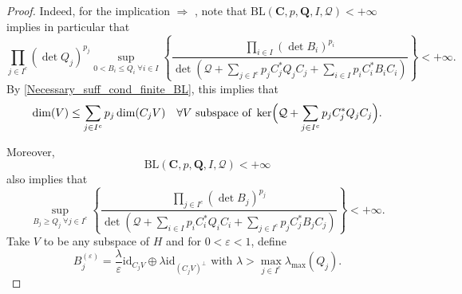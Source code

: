 \documentclass[11pt,a4paper,reqno]{amsart}
\numberwithin{equation}{section}
\theoremstyle{definition}
\newcommand{\<}{\ensuremath \leq}
\renewcommand{\>}{\ensuremath \geq}
\renewcommand{\epsilon}{\varepsilon}
\begin{document}



\begin{proof}
Indeed, for the implication $\Longrightarrow$ , note that $\mathrm{BL}(\textbf{C},p,\textbf{Q},I,\mathcal Q)<+\infty$ implies in particular that $$ \prod_{j \in I^c}(\det Q_j)^{p_j} \sup_{0<B_i \le Q_i\; \forall i \in I} \left\{ \frac{\prod_{i \in I}(\det B_i)^{p_i}}{\det(\mathcal Q+\sum_{j \in I^c}p_jC_j^*Q_jC_j+\sum_{i \in I}p_iC_i^*B_iC_i)} \right\}<+\infty.$$ By \cref{Necessary_suff_cond_finite_BL}, this implies that $$\dim(V) \le \sum_{j \in I^c}p_j\dim(C_jV) \quad \forall V \text{ subspace of } \ker \Bigl(\mathcal Q+\sum_{j \in I^c}p_jC_j^*Q_jC_j \Bigl).$$



Moreover, $$\mathrm{BL}(\textbf{C},p,\textbf{Q},I,\mathcal Q)<+\infty$$ also implies that $$\sup_{B_j \ge Q_j \; \forall j \in I^c} \left\{ \frac{\prod_{j \in I^c}(\det B_j)^{p_j}}{\det(\mathcal Q+\sum_{i \in I}p_iC_i^*Q_iC_i+\sum_{j \in I^c}p_jC_j^*B_jC_j)} \right\}<+\infty.$$ 
Take $V$ to be any subspace of $H$ and for $0<\epsilon<1$, define $$B_j^{(\epsilon)}=\frac{\lambda}{\epsilon}\mathrm{id}_{C_jV} \oplus \lambda \mathrm{id}_{(C_jV)^\perp} \text{ with } \lambda>\max_{j \in I^c}\lambda_{\max}(Q_j).$$ 


\end{proof}
\end{document}
